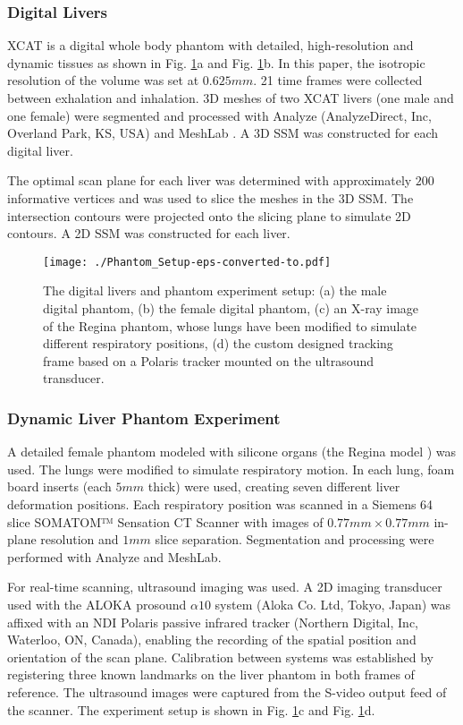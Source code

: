 \documentclass[review]{elsarticle}
\begin{document}
\subsubsection{Digital Livers}
XCAT is a digital whole body phantom with detailed, high-resolution and dynamic tissues \citep{segars20104d} as shown in Fig. \ref{fig:Phantom_Setup}a and Fig. \ref{fig:Phantom_Setup}b. In this paper, the isotropic resolution of the volume was set at $0.625mm$. 21 time frames were collected between exhalation and inhalation. 3D meshes of two XCAT livers (one male and one female) were segmented and processed with Analyze (AnalyzeDirect, Inc, Overland Park, KS, USA) and MeshLab \citep{Meshlab}. A 3D SSM was constructed for each digital liver. 

The optimal scan plane for each liver was determined with approximately $200$ informative vertices and was used to slice the meshes in the 3D SSM. The intersection contours were projected onto the slicing plane to simulate 2D contours. A 2D SSM was constructed for each liver.

\begin{figure}[thpb]
\centering
\texttt{[image: ./Phantom\_Setup-eps-converted-to.pdf]}
\caption{The digital livers and phantom experiment setup: (a) the male digital phantom, (b) the female digital phantom, (c) an X-ray image of the Regina phantom, whose lungs have been modified to simulate different respiratory positions, (d) the custom designed tracking frame based on a Polaris tracker mounted on the ultrasound transducer.}
\label{fig:Phantom_Setup}
\end{figure}

\subsubsection{Dynamic Liver Phantom Experiment}
\label{Sec: Dynamic Phantom}
A detailed female phantom modeled with silicone organs (the Regina model \citep{lerotic2010multimodal}) was used. The lungs were modified to simulate respiratory motion. In each lung, foam board inserts (each $5mm$ thick) were used, creating seven different liver deformation positions. Each respiratory position was scanned in a Siemens 64 slice SOMATOM™ Sensation CT Scanner with images of $0.77 mm \times 0.77 mm$ in-plane resolution and $1mm$ slice separation. Segmentation and processing were performed with Analyze and MeshLab.

For real-time scanning, ultrasound imaging was used. A 2D imaging transducer used with the ALOKA prosound $\alpha10$ system (Aloka Co. Ltd, Tokyo, Japan) was affixed with an NDI Polaris passive infrared tracker (Northern Digital, Inc, Waterloo, ON, Canada), enabling the recording of the spatial position and orientation of the scan plane. Calibration between systems was established by registering three known landmarks on the liver phantom in both frames of reference. The ultrasound images were captured from the S-video output feed of the scanner. The experiment setup is shown in Fig. \ref{fig:Phantom_Setup}c and  Fig. \ref{fig:Phantom_Setup}d.
\end{document}

